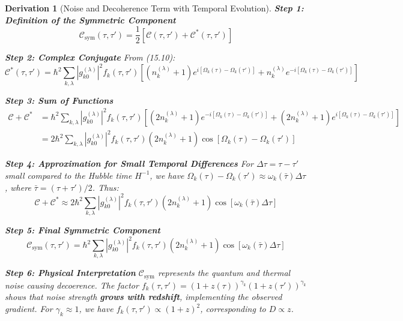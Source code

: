 \documentclass[10pt, a4paper]{article}
\newtheorem{derivation}{Derivation}
\begin{document}
\begin{derivation}[Noise and Decoherence Term with Temporal Evolution]
\textbf{Step 1: Definition of the Symmetric Component}
\begin{equation}
\mathcal{C}_{\text{sym}}(\tau, \tau') = \frac{1}{2} [\mathcal{C}(\tau, \tau') + \mathcal{C}^*(\tau, \tau')]
\tag{16.1}
\end{equation}

\textbf{Step 2: Complex Conjugate}
From (15.10):
\begin{equation}
\mathcal{C}^*(\tau, \tau') = \hbar^2 \sum_{k,\lambda} |g_{k0}^{(\lambda)}|^2 f_k(\tau, \tau') \left[ (n_k^{(\lambda)} + 1) e^{i[\Omega_k(\tau)-\Omega_k(\tau')]} + n_k^{(\lambda)} e^{-i[\Omega_k(\tau)-\Omega_k(\tau')]} \right]
\tag{16.2}
\end{equation}

\textbf{Step 3: Sum of Functions}
\begin{align}
\mathcal{C} + \mathcal{C}^* &= \hbar^2 \sum_{k,\lambda} |g_{k0}^{(\lambda)}|^2 f_k(\tau, \tau') \left[ (2n_k^{(\lambda)} + 1) e^{-i[\Omega_k(\tau)-\Omega_k(\tau')]} + (2n_k^{(\lambda)} + 1) e^{i[\Omega_k(\tau)-\Omega_k(\tau')]} \right] \\
&= 2\hbar^2 \sum_{k,\lambda} |g_{k0}^{(\lambda)}|^2 f_k(\tau, \tau') (2n_k^{(\lambda)} + 1) \cos[\Omega_k(\tau) - \Omega_k(\tau')]
\tag{16.3}
\end{align}

\textbf{Step 4: Approximation for Small Temporal Differences}
For $\Delta\tau = \tau - \tau'$ small compared to the Hubble time $H^{-1}$, we have $\Omega_k(\tau) - \Omega_k(\tau') \approx \omega_k(\bar{\tau}) \Delta\tau$, where $\bar{\tau} = (\tau+\tau')/2$. Thus:
\begin{equation}
\mathcal{C} + \mathcal{C}^* \approx 2\hbar^2 \sum_{k,\lambda} |g_{k0}^{(\lambda)}|^2 f_k(\tau, \tau') (2n_k^{(\lambda)} + 1) \cos[\omega_k(\bar{\tau}) \Delta\tau]
\tag{16.4}
\end{equation}

\textbf{Step 5: Final Symmetric Component}
\begin{equation}
\mathcal{C}_{\text{sym}}(\tau, \tau') = \hbar^2 \sum_{k,\lambda} |g_{k0}^{(\lambda)}|^2 f_k(\tau, \tau') (2n_k^{(\lambda)} + 1) \cos[\omega_k(\bar{\tau}) \Delta\tau]
\tag{16.5}
\end{equation}

\textbf{Step 6: Physical Interpretation}
$\mathcal{C}_{\text{sym}}$ represents the quantum and thermal noise causing decoerence. The factor $f_k(\tau, \tau') = (1+z(\tau))^{\gamma_k}(1+z(\tau'))^{\gamma_k}$ shows that noise strength \textbf{grows with redshift}, implementing the observed gradient. For $\gamma_k \approx 1$, we have $f_k(\tau, \tau') \propto (1+z)^2$, corresponding to $D \propto z$.
\end{derivation}
\end{document}

